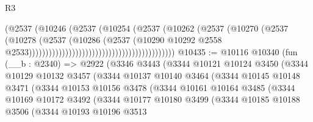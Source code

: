 \begin{lexlean}{R3}
\begin{coremodule}
                                                                (@2537
                                                                  (@10246
                                                                    (@2537
                                                                      (@10254
                                                                        (@2537
                                                                          (@10262
                                                                            (@2537
                                                                              (@10270
                                                                                (@2537
                                                                                  (@10278
                                                                                    (@2537
                                                                                      (@10286
                                                                                        (@2537
                                                                                          (@10290
                                                                                            @10292
                                                                                            @2558
                                                                                            @2533))))))))))))))))))))))))))))))))))))))))))))
@10435 := @10116
    @10340
    (fun (__b : @2340) =>
    @2922
      (@3346
        @3443
        (@3344
          @10121
          @10124
          @3450
          (@3344
            @10129
            @10132
            @3457
            (@3344
              @10137
              @10140
              @3464
              (@3344
                @10145
                @10148
                @3471
                (@3344
                  @10153
                  @10156
                  @3478
                  (@3344
                    @10161
                    @10164
                    @3485
                    (@3344
                      @10169
                      @10172
                      @3492
                      (@3344
                        @10177
                        @10180
                        @3499
                        (@3344
                          @10185
                          @10188
                          @3506
                          (@3344
                            @10193
                            @10196
                            @3513

\end{coremodule}
\end{lexlean}
